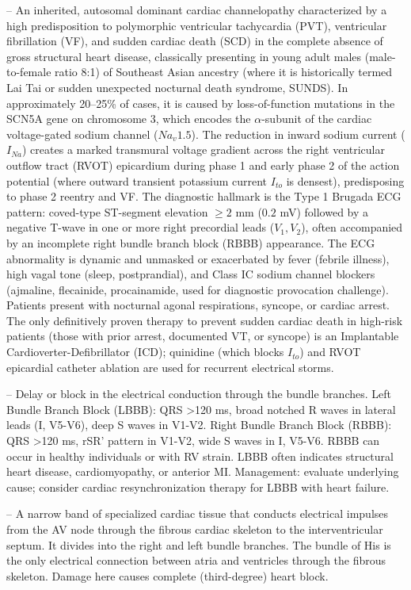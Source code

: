 -- An inherited, autosomal dominant cardiac channelopathy characterized by a high predisposition to polymorphic ventricular tachycardia (PVT), ventricular fibrillation (VF), and sudden cardiac death (SCD) in the complete absence of gross structural heart disease, classically presenting in young adult males (male-to-female ratio 8:1) of Southeast Asian ancestry (where it is historically termed Lai Tai or sudden unexpected nocturnal death syndrome, SUNDS). In approximately 20--25\% of cases, it is caused by loss-of-function mutations in the SCN5A gene on chromosome 3, which encodes the $\alpha$-subunit of the cardiac voltage-gated sodium channel ($Na_v1.5$). The reduction in inward sodium current ($I_{Na}$) creates a marked transmural voltage gradient across the right ventricular outflow tract (RVOT) epicardium during phase 1 and early phase 2 of the action potential (where outward transient potassium current $I_{to}$ is densest), predisposing to phase 2 reentry and VF. The diagnostic hallmark is the Type 1 Brugada ECG pattern: coved-type ST-segment elevation $\ge 2$ mm ($0.2$ mV) followed by a negative T-wave in one or more right precordial leads ($V_1, V_2$), often accompanied by an incomplete right bundle branch block (RBBB) appearance. The ECG abnormality is dynamic and unmasked or exacerbated by fever (febrile illness), high vagal tone (sleep, postprandial), and Class IC sodium channel blockers (ajmaline, flecainide, procainamide, used for diagnostic provocation challenge). Patients present with nocturnal agonal respirations, syncope, or cardiac arrest. The only definitively proven therapy to prevent sudden cardiac death in high-risk patients (those with prior arrest, documented VT, or syncope) is an Implantable Cardioverter-Defibrillator (ICD); quinidine (which blocks $I_{to}$) and RVOT epicardial catheter ablation are used for recurrent electrical storms.

-- Delay or block in the electrical conduction through the bundle branches. Left Bundle Branch Block (LBBB): QRS >120 ms, broad notched R waves in lateral leads (I, V5-V6), deep S waves in V1-V2. Right Bundle Branch Block (RBBB): QRS >120 ms, rSR' pattern in V1-V2, wide S waves in I, V5-V6. RBBB can occur in healthy individuals or with RV strain. LBBB often indicates structural heart disease, cardiomyopathy, or anterior MI. Management: evaluate underlying cause; consider cardiac resynchronization therapy for LBBB with heart failure.

-- A narrow band of specialized cardiac tissue that conducts electrical impulses from the AV node through the fibrous cardiac skeleton to the interventricular septum. It divides into the right and left bundle branches. The bundle of His is the only electrical connection between atria and ventricles through the fibrous skeleton. Damage here causes complete (third-degree) heart block.

